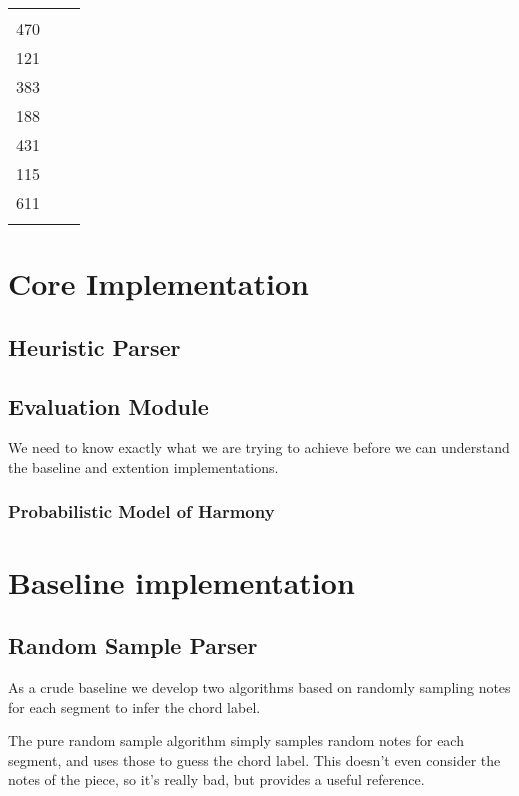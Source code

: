 \documentclass[12pt,a4paper,twoside,openright]{report}
\begin{document}
\begin{table}[h]
\begin{tabularx}{\textwidth}{l X c}
\begin{minipage}[t]{8cm}
  \end{minipage} & 
  \begin{minipage}[t]{0.5cm}
    2272
    \vspace{0.1\DTbaselineskip}\\
    470\\
    \vspace{\DTbaselineskip}
    121\\
    \vspace{\DTbaselineskip}
    383\\
    \vspace{1.8\DTbaselineskip}
    188\\
    \vspace{3.7\DTbaselineskip}
    431\\
    \vspace{3\DTbaselineskip}
    115\\
    \vspace{2.5\DTbaselineskip}
    611\\
  \end{minipage}
\end{tabularx}
\end{table}

\section{Core Implementation}

\subsection{Heuristic Parser}

\subsection{Evaluation Module}
We need to know exactly what we are trying to achieve before we can understand the baseline and extention implementations.

\subsubsection{Probabilistic Model of Harmony}

\section{Baseline implementation}
\subsection{Random Sample Parser}
As a crude baseline we develop two algorithms based on randomly sampling notes for each segment to infer the chord label. 
\par
The pure random sample algorithm simply samples random notes for each segment, and uses those to guess the chord label. This doesn't even consider the notes of the piece, so it's really bad, but provides a useful reference.
\end{document}
